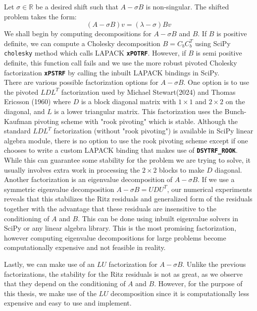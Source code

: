 Let $\sigma \in \mathbb{R}$ be a desired shift such that $A - \sigma B$ is non-singular. The shifted problem takes the form:
\begin{equation}\label{3.3}
	(A - \sigma B)v = (\lambda - \sigma)Bv
\end{equation}
We shall begin by computing decompositions for $A - \sigma B$ and $B$. If $B$ is positive  definite, we can compute a Cholesky decomposition $B = C_bC_b^T$ using SciPy \texttt{cholesky} method which calls LAPACK \textbf{\texttt{xPOTRF}}. However, if $B$ is semi positive definite, this function call fails and we use the more robust pivoted Cholesky factorization \textbf{\texttt{xPSTRF}} by calling the inbuilt LAPACK bindings in SciPy.\\
There are various possible factorization options for $A-\sigma B$. One option is to use the pivoted $LDL^{T}$ factorization used by Michael Stewart(2024) and Thomas Ericsson (1960) where $D$ is a block diagonal matrix with $1 \times 1$ and $2 \times 2$ on the diagonal, and $L$ is a lower triangular matrix. This factorization uses the Bunch-Kaufman pivoting scheme with "rook pivoting" which is stable. Although the standard $LDL^T$ factorization (without "rook pivoting") is available in SciPy linear algebra module, there is no option to use the rook pivoting scheme except if one chooses to write a custom LAPACK binding that makes use of \textbf{\texttt{DSYTRF\_ROOK}}. While this can guarantee some stability for the problem we are trying to solve, it usually involves extra work in processing the $2 \times 2$ blocks to make $D$ diagonal.\\
Another factorization is an eigenvalue decomposition of $A - \sigma B$. If we use a symmetric eigenvalue decomposition $A- \sigma B = UDU^T$, our numerical experiments reveals that this stabilizes the Ritz residuals and generalized form of the residuals together with the advantage that these residuals are insensitive to the conditioning of $A$ and $B$. This can be done using inbuilt eigenvalue solvers in SciPy or any linear algebra library. This is the most promising factorization, however computing eigenvalue decompositions for large problems become computationally expensive and not feasible in reality.

Lastly, we can make use of an $LU$ factorization for $A-\sigma B$. Unlike the previous factorizations, the stability for the Ritz residuals is not as great, as we observe that they depend on the conditioning of $A$ and $B$. However, for the purpose of this thesis, we make use of the $LU$ decomposition since it is computationally less expensive and easy to use and implement.

